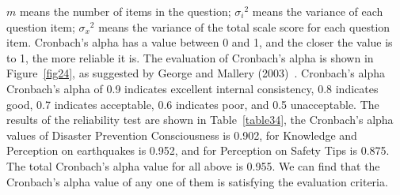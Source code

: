 $m$ means the number of items in the question; ${\sigma_i}^2$ means the variance of each question item; ${\sigma_x}^2$ means the variance of the total scale score for each question item. Cronbach's alpha has a value between 0 and 1, and the closer the value is to 1, the more reliable it is. The evaluation of Cronbach's alpha is shown in Figure~\ref{fig24}, as suggested by George and Mallery (2003)~\cite{ref1}. Cronbach's alpha  Cronbach's alpha of 0.9 indicates excellent internal consistency, 0.8 indicates good, 0.7 indicates acceptable, 0.6 indicates poor, and 0.5 unacceptable. The results of the reliability test are shown in Table~\ref{table34}, the Cronbach's alpha values of Disaster Prevention Consciousness is 0.902, for Knowledge and Perception on earthquakes is 0.952, and for Perception on Safety Tips is 0.875. The total Cronbach's alpha value for all above is 0.955. We can find that the Cronbach's alpha value of any one of them is satisfying the evaluation criteria.




